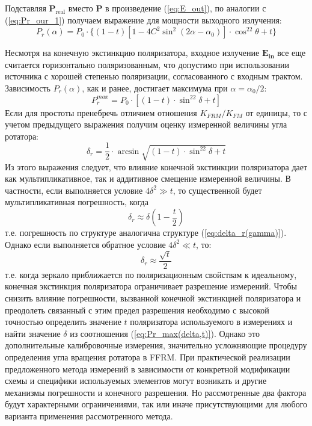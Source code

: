 \documentclass{article}
\begin{document}
Подставляя $\bm{P}_{\text{real}}$ вместо $\bm{P}$ в произведение (\ref{eq:E_out}), по аналогии с (\ref{eq:Pr_our_1}) получаем выражение для мощности выходного излучения:
\begin{equation}
    P_r(\alpha)=P_0\cdot\{(1-t)\left[1-4C^2\sin^2(2\alpha-\alpha_0)\right]\cdot \cos^22\theta+t \}
\end{equation}

Несмотря на конечную экстинкцию поляризатора, входное излучение $\bm{E_{in}}$ все еще считается горизонтально поляризованным, что допустимо при использовании источника с хорошей степенью поляризации, согласованного с входным трактом.
Зависимость $P_r(\alpha)$, как и ранее, достигает максимума при $\alpha=\alpha_0/2$: 
\begin{equation}
    \label{eq:Pr_max(delta,t)}
    P_r^{max}=P_0\cdot\left[(1-t)\cdot \sin^22\delta+t \right]
\end{equation}
Если для простоты пренебречь отличием отношения $K_{FRM}/K_{FM}$ от единицы, то с учетом предыдущего выражения получим оценку измеренной величины угла ротатора:
\begin{equation}
    \label{eq:delta_est(delta, t)}
    \delta_r=\frac{1}{2}\cdot\arcsin\sqrt{(1-t)\cdot \sin^22\delta+t}
\end{equation}
Из этого выражения следует, что влияние конечной экстинкции поляризатора дает как мультипликативное, так и аддитивное смещение измеренной величины. В частности, если выполняется условие $4\delta^2\gg t$, то существенной будет мультипликативная погрешность, когда
\begin{equation}
    \delta_r \approx \delta\left(1-\frac{t}{2}\right)
\end{equation}
т.е. погрешность по структуре аналогична структуре (\ref{eq:delta_r(gamma)}). Однако если выполняется обратное условие $4\delta^2\ll t$, то:
\begin{equation}
    \delta_r \approx \frac{\sqrt{t}}{2}
\end{equation}
т.е. когда зеркало приближается по поляризационным свойствам к идеальному, конечная экстинкция поляризатора ограничивает разрешение измерений.
Чтобы снизить влияние погрешности, вызванной конечной экстинкцией поляризатора и преодолеть связанный с этим предел разрешения необходимо с высокой точностью определить значение $t$ поляризатора используемого в измерениях и найти значение $\delta$ из соотношения (\ref{eq:Pr_max(delta,t)}).
Однако это дополнительные калибровочные измерения, значительно усложняющие процедуру определения угла вращения ротатора в FFRM.
При практической реализации предложенного метода измерений в зависимости от конкретной модификации схемы и специфики используемых элементов могут возникать и другие механизмы погрешности и конечного разрешения.
Но рассмотренные два фактора будут характерными ограничениями, так или иначе присутствующими для любого варианта применения рассмотренного метода.   
\end{document}
